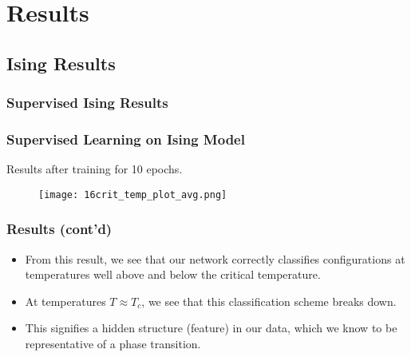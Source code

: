 \documentclass{beamer}
\begin{document}
\section{Results}

\subsection{Ising Results}
\subsubsection{Supervised Ising Results}
\begin{frame}
\frametitle{Supervised Learning on Ising Model}
	Results after training for 10 epochs.
	\begin{figure}
		\texttt{[image: 16crit\_temp\_plot\_avg.png]}
	\end{figure}
\end{frame}

\begin{frame}
\frametitle{Results (cont'd)}
	\begin{itemize}
		\item From this result, we see that our network correctly classifies configurations
			at temperatures well above and below the critical temperature.
		\item At temperatures $T \approx T_c$, we see that this classification scheme breaks down.
		\item This signifies a hidden structure (feature) in our data, which we know to be representative of a phase transition.
	\end{itemize}
\end{frame}
\end{document}
